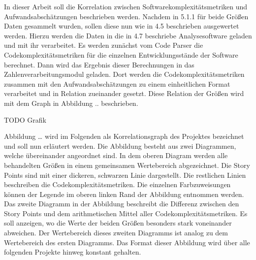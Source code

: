 In dieser Arbeit soll die Korrelation zwischen
Softwarekomplexitätsmetriken und Aufwandsabschätzungen beschrieben
werden. Nachdem in 5.1.1 für beide Größen Daten gesammelt wurden, sollen
diese nun wie in 4.5 beschrieben ausgewertet werden. Hierzu werden die
Daten in die in 4.7 beschriebe Analysesoftware geladen und mit ihr
verarbeitet. Es werden zunächst vom Code Parser die
Codekomplexitätsmetriken für die einzelnen Entwicklungsstände der
Software berechnet. Dann wird das Ergebnis dieser Berechnungen in das
Zahlenverarbeitungsmodul geladen. Dort werden die
Codekomplexitätsmetriken zusammen mit den Aufwandsabschätzungen zu einem
einheitlichen Format verarbeitet und in Relation zueinander gesetzt.
Diese Relation der Größen wird mit dem Graph in Abbildung ..
beschrieben.

TODO Grafik

Abbildung \ldots{} wird im Folgenden als Korrelationsgraph des Projektes
bezeichnet und soll nun erläutert werden. Die Abbildung besteht aus zwei
Diagrammen, welche übereinander angeordnet sind. In dem oberen Diagram
werden alle behandelten Größen in einem gemeinsamen Wertebereich
abgezeichnet. Die Story Points sind mit einer dickeren, schwarzen Linie
dargestellt. Die restlichen Linien beschreiben die
Codekomplexitätsmetriken. Die einzelnen Farbzuweisungen können der
Legende im oberen linken Rand der Abbildung entnommen werden. Das zweite
Diagramm in der Abbildung beschreibt die Differenz zwischen den Story
Points und dem arithmetischen Mittel aller Codekomplexitätsmetriken. Es
soll anzeigen, wo die Werte der beiden Größen besonders stark
voneinander abweichen. Der Wertebereich dieses zweiten Diagramms ist
analog zu dem Wertebereich des ersten Diagramms. Das Format dieser
Abbildung wird über alle folgenden Projekte hinweg konstant gehalten.

